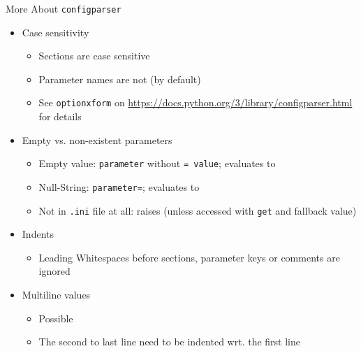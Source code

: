 \begin{frame}{More About \texttt{configparser}}
%
\begin{itemize}
\item Case sensitivity
	\begin{itemize}
	\item Sections are case sensitive
	\item Parameter names are not (by default)
	\item See \texttt{optionxform} on \url{https://docs.python.org/3/library/configparser.html} for details
	\end{itemize}
\item Empty vs. non-existent parameters
	\begin{itemize}
	\item Empty value: \texttt{parameter} without \texttt{= value}; evaluates to 
	\item Null-String: \texttt{parameter=}; evaluates to 
	\item Not in \texttt{.ini} file at all: raises  (unless accessed with \texttt{get} and fallback value)
	\end{itemize}
\item Indents
	\begin{itemize}
	\item Leading Whitespaces before sections, parameter keys or comments are ignored
	\end{itemize}
\item Multiline values
	\begin{itemize}
	\item Possible
	\item The second to last line need to be indented wrt. the first line
	\end{itemize}
\end{itemize}
%
\end{frame}


